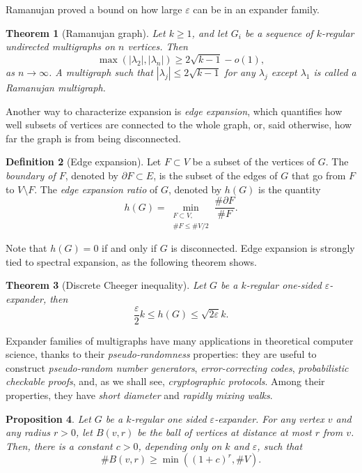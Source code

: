 \documentclass[10pt]{article}
\theoremstyle{plain}
\newtheorem{theorem}{Theorem}
\newtheorem{proposition}[theorem]{Proposition}
\theoremstyle{definition}
\newtheorem{definition}[theorem]{Definition}
\begin{document}
\begin{prposition}
Ramanujan proved a bound on how large $ε$ can be in an expander
family. %

\begin{theorem}[Ramanujan graph]
  Let $k≥1$, and let $G_i$ be a sequence of $k$-regular undirected
  multigraphs on $n$ vertices. %
  Then
  \[\max(|λ_2|,|λ_n|) ≥ 2\sqrt{k-1} - o(1),\]
  as $n→∞$. %
  A multigraph such that $|λ_j|≤2\sqrt{k-1}$ for any $λ_j$ except
  $λ_1$ is called a \emph{Ramanujan multigraph}.
\end{theorem}

Another way to characterize expansion is \emph{edge expansion}, which
quantifies how well subsets of vertices are connected to the whole
graph, or, said otherwise, how far the graph is from being
disconnected.

\begin{definition}[Edge expansion]
  Let $F⊂V$ be a subset of the vertices of $G$. %
  The \emph{boundary of $F$}, denoted by $∂F⊂E$, is the subset of the
  edges of $G$ that go from $F$ to $V\setminus F$. %
  The \emph{edge expansion ratio} of $G$, denoted by $h(G)$ is the
  quantity
  \[h(G) = \min_{\substack{F⊂V,\\ \#F≤\#V/2}}\frac{\#∂F}{\#F}.\]
\end{definition}

Note that $h(G)=0$ if and only if $G$ is disconnected. %
Edge expansion is strongly tied to spectral expansion, as the
following theorem shows.

\begin{theorem}[Discrete Cheeger inequality]
  Let $G$ be a $k$-regular one-sided $ε$-expander, then
  \[\frac{ε}{2}k≤h(G)≤\sqrt{2ε}k.\]
\end{theorem}

Expander families of multigraphs have many applications in theoretical
computer science, thanks to their \emph{pseudo-randomness} properties:
they are useful to construct \emph{pseudo-random number generators},
\emph{error-correcting codes}, \emph{probabilistic checkable proofs},
and, as we shall see, \emph{cryptographic protocols}. %
Among their properties, they have \emph{short diameter} and
\emph{rapidly mixing walks}.

\begin{proposition}
  \label{th:diameter}
  Let $G$ be a $k$-regular one sided $ε$-expander. %
  For any vertex $v$ and any radius $r>0$, let $B(v,r)$ be the
  \emph{ball} of vertices at distance at most $r$ from $v$. %
  Then, there is a constant $c>0$, depending only on $k$ and $ε$, such
  that
  \[\#B(v,r)≥\min((1+c)^r,\#V).\]
\end{proposition}


\end{prposition}
\end{document}
